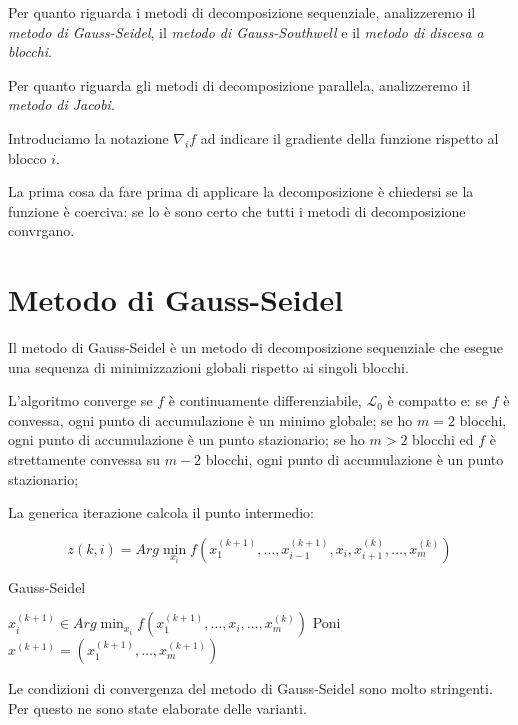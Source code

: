 Per quanto riguarda i metodi di decomposizione sequenziale, analizzeremo il \textit{metodo di Gauss-Seidel}, il \textit{metodo di Gauss-Southwell} e il \textit{metodo di discesa a blocchi}.

Per quanto riguarda gli metodi di decomposizione parallela, analizzeremo il  \textit{metodo di Jacobi}.

Introduciamo la notazione $\nabla_{i}f$ ad indicare il gradiente della funzione rispetto al blocco $i$.

La prima cosa da fare prima di applicare la decomposizione è chiedersi se la funzione è coerciva: se lo è sono certo che tutti i metodi di decomposizione convrgano.


\section{Metodo di Gauss-Seidel}
\label{sec:methods.decomposition.gauss-seidel}
Il metodo di Gauss-Seidel è un metodo di decomposizione sequenziale che esegue una sequenza di minimizzazioni globali rispetto ai singoli blocchi.

L'algoritmo converge se $f$ è continuamente differenziabile, $\mathcal{L}_{0}$ è compatto e:
se $f$ è convessa, ogni punto di accumulazione è un minimo globale;
se ho $m=2$ blocchi, ogni punto di accumulazione è un punto stazionario;
se ho $m>2$ blocchi ed $f$ è strettamente convessa su $m-2$ blocchi, ogni punto di accumulazione è un punto stazionario;

La generica iterazione calcola il punto intermedio:

\begin{equation}
    z(k,i)=Arg\min_{x_{i}}f(x_{1}^{(k+1)},\ldots,x_{i-1}^{(k+1)},x_{i},x_{i+1}^{(k)},\ldots,x_{m}^{(k)})
\end{equation}

\begin{algorithm}
  \label{alg:methods.decomposition.gauss-seidel}
  \caption{Gauss-Seidel}

   {
     {
      $x_{i}^{(k+1)}\in Arg \min_{x_{i}} f(x_{1}^{(k+1)},\ldots,x_{i},\ldots,x_{m}^{(k)})$
    }
    Poni $x^{(k+1)}=(x_{1}^{(k+1)},\ldots,x_{m}^{(k+1)})$
  }
\end{algorithm}

Le condizioni di convergenza del metodo di Gauss-Seidel sono molto stringenti. Per questo ne sono state elaborate delle varianti.

